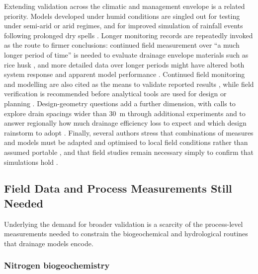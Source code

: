 Extending validation across the climatic and management envelope is a related priority. Models developed under humid conditions are singled out for testing under semi-arid or arid regimes, and for improved simulation of rainfall events following prolonged dry spells \parencite{Prasher1996}. Longer monitoring records are repeatedly invoked as the route to firmer conclusions: continued field measurement over ``a much longer period of time'' is needed to evaluate drainage envelope materials such as rice husk \parencite{Ebrahimian2011}, and more detailed data over longer periods might have altered both system response and apparent model performance \parencite{Negm2017}. Continued field monitoring and modelling are also cited as the means to validate reported results \parencite{Grazhdani1996}, while field verification is recommended before analytical tools are used for design or planning \parencite{Hornbuckle2012}. Design-geometry questions add a further dimension, with calls to explore drain spacings wider than 30~m through additional experiments \parencite{Mathew2001} and to answer regionally how much drainage efficiency loss to expect and which design rainstorm to adopt \parencite{Wiskow2003}. Finally, several authors stress that combinations of measures and models must be adapted and optimised to local field conditions rather than assumed portable \parencite{MULLER1988}, and that field studies remain necessary simply to confirm that simulations hold \parencite{Shipitalo2016,Yousfi2014}.

\subsection{Field Data and Process Measurements Still Needed}

Underlying the demand for broader validation is a scarcity of the process-level measurements needed to constrain the biogeochemical and hydrological routines that drainage models encode.

\subsubsection{Nitrogen biogeochemistry}

